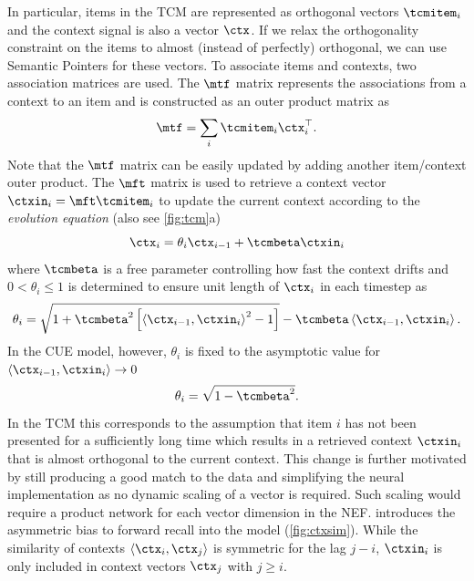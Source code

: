 In particular, items in the TCM are represented as orthogonal vectors $\tcmitem_i$ and the context signal is also a vector $\ctx$.
If we relax the orthogonality constraint on the items to almost (instead of perfectly) orthogonal, we can use Semantic Pointers for these vectors.
To associate items and contexts, two association matrices are used.
The $\mtf$ matrix represents the associations from a context to an item and is constructed as an outer product matrix as
\begin{equation}
    \mtf = \sum_i \tcmitem_i \ctx_i\Tr \text{.}
\end{equation}
Note that the $\mtf$ matrix can be easily updated by adding another item/context outer product.
The $\mft$ matrix is used to retrieve a context vector $\ctxin_i = \mft \tcmitem_i$ to update the current context according to the \emph{evolution equation} (also see \cref{fig:tcm}a)
\begin{equation}
    \ctx_i = \theta_i \ctx_{i-1} + \tcmbeta \ctxin_i\label{eqn:ctx-update}
\end{equation}
where $\tcmbeta$ is a free parameter controlling how fast the context drifts and $0 < \theta_i \leq 1$ is determined to ensure unit length of $\ctx_i$ in each timestep as
\begin{equation}
    \theta_i = \sqrt{1 + \tcmbeta^2 \sbr{\left\langle\ctx_{i-1}, \ctxin_i\right\rangle^2 - 1}} - \tcmbeta \left\langle\ctx_{i-1}, \ctxin_i\right\rangle\text{.}
\end{equation}
In the CUE model, however, $\theta_i$ is fixed to the asymptotic value for $\langle\ctx_{i-1}, \ctxin_i\rangle \rightarrow 0$
\begin{equation}
    \theta_i = \sqrt{1 - \tcmbeta^2}\text{.}
\end{equation}
In the TCM this corresponds to the assumption that item $i$ has not been presented for a sufficiently long time which results in a retrieved context $\ctxin_i$ that is almost orthogonal to the current context.
This change is further motivated by still producing a good match to the data and simplifying the neural implementation as no dynamic scaling of a vector is required.
Such scaling would require a product network for each vector dimension in the NEF\@.
 introduces the asymmetric bias to forward recall into the model (\cref{fig:ctxsim}).
While the similarity of contexts $\langle\ctx_i, \ctx_j\rangle$ is symmetric for the lag $j - i$, $\ctxin_i$ is only included in context vectors $\ctx_j$ with $j \geq i$.
